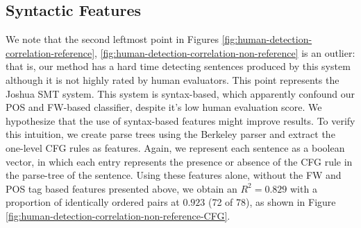 \documentclass[11pt]{article}
\begin{document}
\subsection{Syntactic Features}
We note that the second leftmost point in Figures \ref{fig:human-detection-correlation-reference}, \ref{fig:human-detection-correlation-non-reference} is an outlier: that is, our method has a hard time detecting sentences produced by this system although it is not highly rated by human evaluators. This point represents the Joshua \cite{citeulike:12539454} SMT system. This system is syntax-based, which apparently confound our POS and FW-based classifier, despite it's low human evaluation score. We hypothesize that the use of syntax-based features might improve results. To verify this intuition, we create parse trees using the Berkeley parser \cite{Petrov2007} and extract the one-level CFG rules as features. Again, we represent each sentence as a boolean vector, in which each entry represents the presence or absence of the CFG rule in the parse-tree of the sentence. %
Using these features alone, without the FW and POS tag based features presented above, we obtain an $R^2 = 0.829$ with a proportion of identically ordered pairs at $0.923$ (72 of 78), as shown in Figure \ref{fig:human-detection-correlation-non-reference-CFG}.
\end{document}
